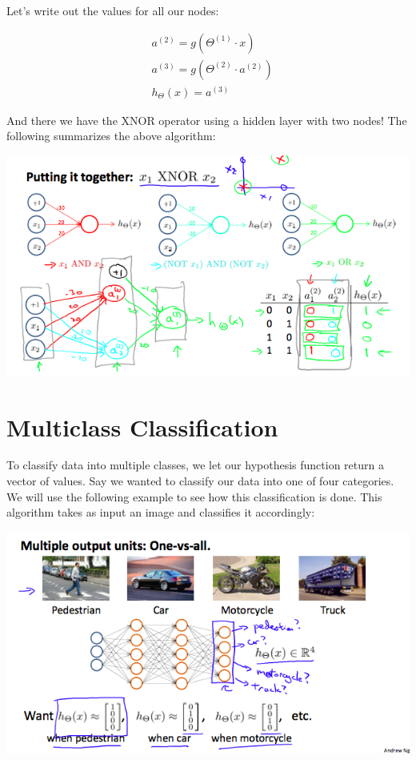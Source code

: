 \documentclass[10pt,a4paper,UTF8]{article}
\begin{document}
Let's write out the values for all our nodes:


\begin{align*}& a^{(2)} = g(\Theta^{(1)} \cdot x) \\& a^{(3)} = g(\Theta^{(2)} \cdot a^{(2)}) \\& h_\Theta(x) = a^{(3)}\end{align*}

And there we have the XNOR operator using a hidden layer with two nodes! The following summarizes the above algorithm:

\begin{center}
\includegraphics[width=.9\linewidth]{../../img/computer_ng/20171012nor.png}
\end{center}

\section{Multiclass Classification}
\label{sec:orgc59a013}


To classify data into multiple classes, we let our hypothesis function return a vector of values. Say we wanted to classify our data into one of four categories. We will use the following example to see how this classification is done. This algorithm takes as input an image and classifies it accordingly:

\begin{center}
\includegraphics[width=.9\linewidth]{../../img/computer_ng/20171012multipleClassification.png}
\end{center}
\end{document}
